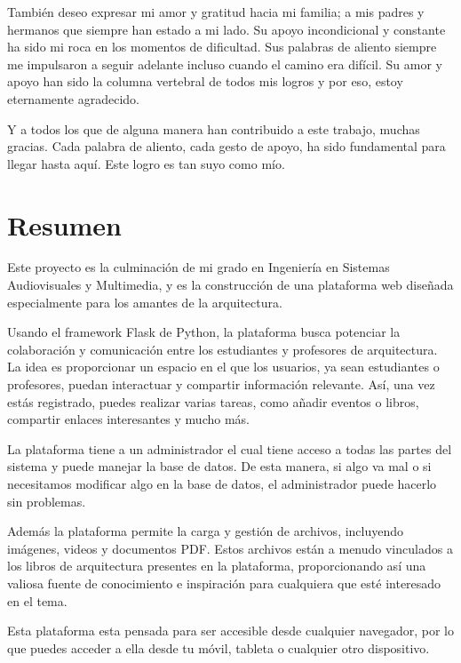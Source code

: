 \documentclass[a4paper, 12pt]{book}
\begin{document}
También deseo expresar mi amor y gratitud hacia mi familia; a mis padres y hermanos que siempre han estado a mi lado. 
Su apoyo incondicional y constante ha sido mi roca en los momentos de dificultad. Sus palabras de aliento siempre me 
impulsaron a seguir adelante incluso cuando el camino era difícil. Su amor y apoyo han sido la columna vertebral de 
todos mis logros y por eso, estoy eternamente agradecido. 

Y a todos los que de alguna manera han contribuido a este trabajo, muchas gracias. Cada palabra de aliento, cada 
gesto de apoyo, ha sido fundamental para llegar hasta aquí. Este logro es tan suyo como mío.



\chapter*{Resumen}

Este proyecto es la culminación de mi grado en Ingeniería en Sistemas Audiovisuales y Multimedia, y es la construcción de una 
plataforma web diseñada especialmente para los amantes de la arquitectura. 

Usando el framework Flask de Python, la plataforma busca potenciar la colaboración y comunicación entre los estudiantes y profesores 
de arquitectura. La idea es proporcionar un espacio en el que los usuarios, ya sean estudiantes o profesores, puedan interactuar y 
compartir información relevante. Así, una vez estás registrado, puedes realizar varias tareas, como añadir eventos o libros, compartir 
enlaces interesantes y mucho más. 

La plataforma tiene a un administrador el cual tiene acceso a todas las partes del sistema y puede manejar la base de datos. 
De esta manera, si algo va mal o si necesitamos modificar algo en la base de datos, el administrador puede hacerlo sin problemas.

Además la plataforma permite la carga y gestión de archivos, incluyendo imágenes, videos y documentos PDF. Estos 
archivos están a menudo vinculados a los libros de arquitectura presentes en la plataforma, proporcionando así una valiosa fuente de 
conocimiento e inspiración para cualquiera que esté interesado en el tema. 

Esta plataforma esta pensada para ser accesible desde cualquier navegador, por lo que puedes acceder a ella desde tu móvil, tableta o 
cualquier otro dispositivo. 
\end{document}
